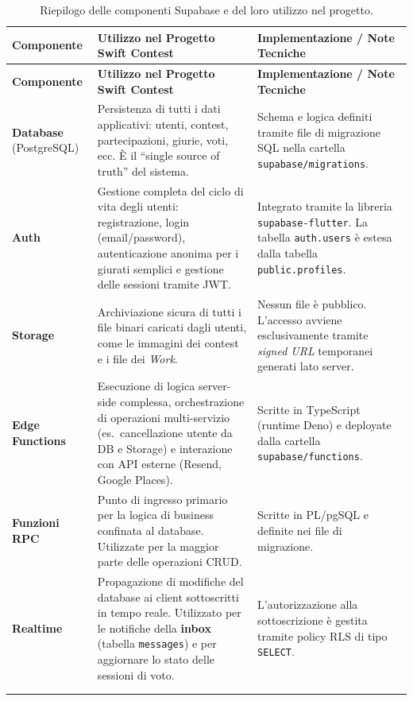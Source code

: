 \begin{longtable}{p{} p{} p{}}
    \toprule
    \textbf{Componente} & \textbf{Utilizzo nel Progetto Swift Contest} & \textbf{Implementazione / Note Tecniche} \\
    \midrule
    \endfirsthead
    \toprule
    \textbf{Componente} & \textbf{Utilizzo nel Progetto Swift Contest} & \textbf{Implementazione / Note Tecniche} \\
    \midrule
    \endhead

    \textbf{Database} \newline (PostgreSQL) &
    Persistenza di tutti i dati applicativi: utenti, contest, partecipazioni, giurie, voti, ecc.
    È il ``single source of truth'' del sistema.
    &
    Schema e logica definiti tramite file di migrazione SQL nella cartella \texttt{supabase/migrations}. \\
    \midrule

    \textbf{Auth} &
    Gestione completa del ciclo di vita degli utenti: registrazione, login (email/password), autenticazione anonima per i giurati semplici e gestione delle sessioni tramite JWT. &
    Integrato tramite la libreria \texttt{supabase-flutter}.
    La tabella \texttt{auth.users} è estesa dalla tabella \texttt{public.profiles}. \\
    \midrule

    \textbf{Storage} &
    Archiviazione sicura di tutti i file binari caricati dagli utenti, come le immagini dei contest e i file dei \emph{Work}. &
    Nessun file è pubblico.
    L'accesso avviene esclusivamente tramite \emph{signed URL} temporanei generati lato server. \\
    \midrule

    \textbf{Edge Functions} &
    Esecuzione di logica server-side complessa, orchestrazione di operazioni multi-servizio (es.\ cancellazione utente da DB e Storage) e interazione con API esterne (Resend, Google Places).
    &
    Scritte in TypeScript (runtime Deno) e deployate dalla cartella \texttt{supabase/functions}. \\
    \midrule

    \textbf{Funzioni RPC} &
    Punto di ingresso primario per la logica di business confinata al database.
    Utilizzate per la maggior parte delle operazioni CRUD. &
    Scritte in PL/pgSQL e definite nei file di migrazione. \\
    \midrule

    \textbf{Realtime} &
    Propagazione di modifiche del database ai client sottoscritti in tempo reale.
    Utilizzato per le notifiche della \textbf{inbox} (tabella \texttt{messages}) e per aggiornare lo stato delle sessioni di voto.
    &
    L'autorizzazione alla sottoscrizione è gestita tramite policy RLS di tipo \texttt{SELECT}. \\

    \bottomrule \\
    \caption{Riepilogo delle componenti Supabase e del loro utilizzo nel progetto.}
    \label{tab:supabase_components}
\end{longtable}

